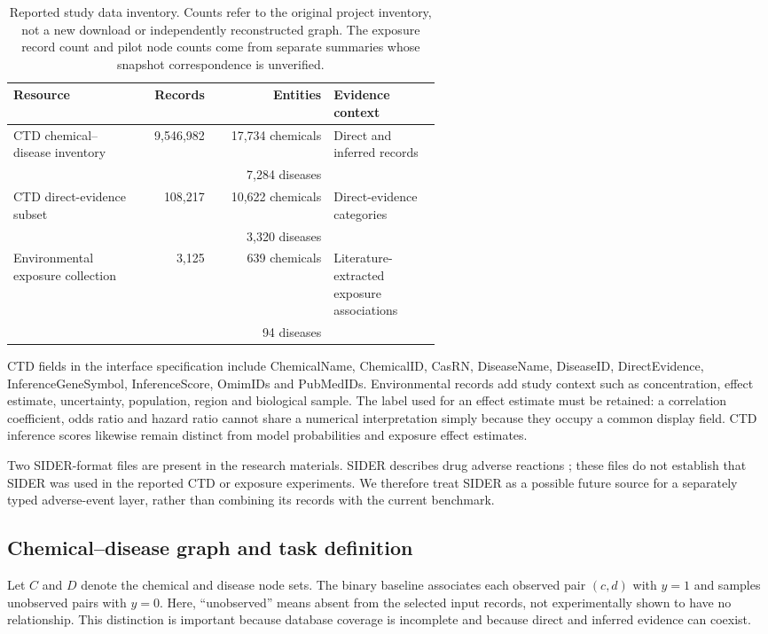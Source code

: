 \begin{table}[htbp]
\centering\small
\caption{Reported study data inventory. Counts refer to the original project inventory, not a new download or independently reconstructed graph. The exposure record count and pilot node counts come from separate summaries whose snapshot correspondence is unverified.}
\label{tab:data}
\begin{tabular}{p{0.31\linewidth}rrp{0.25\linewidth}}
\toprule
Resource & Records & Entities & Evidence context \\
\midrule
CTD chemical--disease inventory & 9,546,982 & 17,734 chemicals & Direct and inferred records \\
 & & 7,284 diseases & \\
CTD direct-evidence subset & 108,217 & 10,622 chemicals & Direct-evidence categories \\
 & & 3,320 diseases & \\
Environmental exposure collection & 3,125 & 639 chemicals & Literature-extracted exposure associations \\
 & & 94 diseases & \\
\bottomrule
\end{tabular}
\end{table}

CTD fields in the interface specification include ChemicalName, ChemicalID, CasRN, DiseaseName, DiseaseID, DirectEvidence, InferenceGeneSymbol, InferenceScore, OmimIDs and PubMedIDs. Environmental records add study context such as concentration, effect estimate, uncertainty, population, region and biological sample. The label used for an effect estimate must be retained: a correlation coefficient, odds ratio and hazard ratio cannot share a numerical interpretation simply because they occupy a common display field. CTD inference scores likewise remain distinct from model probabilities and exposure effect estimates.

Two SIDER-format files are present in the research materials. SIDER describes drug adverse reactions \citep{sider}; these files do not establish that SIDER was used in the reported CTD or exposure experiments. We therefore treat SIDER as a possible future source for a separately typed adverse-event layer, rather than combining its records with the current benchmark.

\subsection{Chemical--disease graph and task definition}
Let $C$ and $D$ denote the chemical and disease node sets. The binary baseline associates each observed pair $(c,d)$ with $y=1$ and samples unobserved pairs with $y=0$. Here, ``unobserved'' means absent from the selected input records, not experimentally shown to have no relationship. This distinction is important because database coverage is incomplete and because direct and inferred evidence can coexist.

